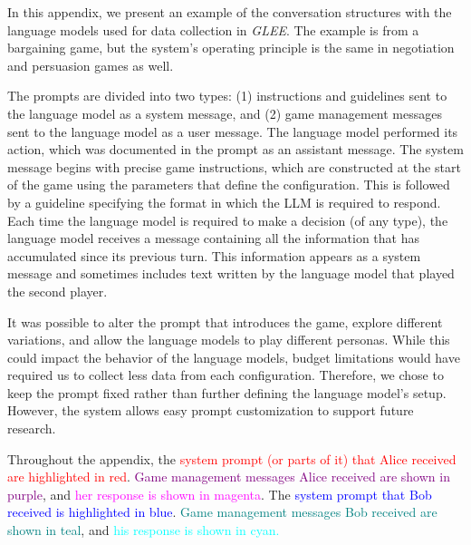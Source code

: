 \newcommand{\aliceSystem}[1]{\textcolor{red}{#1}}
\newcommand{\alicePrompt}[1]{\textcolor{purple}{#1}}
\newcommand{\aliceMessage}[1]{\textcolor{magenta}{#1}}

\newcommand{\bobSystem}[1]{\textcolor{blue}{#1}}
\newcommand{\bobPrompt}[1]{\textcolor{teal}{#1}}
\newcommand{\bobMessage}[1]{\textcolor{cyan}{#1}}

In this appendix, we present an example of the conversation structures with the language models used for data collection in \textit{GLEE}. The example is from a bargaining game, but the system's operating principle is the same in negotiation and persuasion games as well.

The prompts are divided into two types: (1) instructions and guidelines sent to the language model as a system message, and (2) game management messages sent to the language model as a user message. The language model performed its action, which was documented in the prompt as an assistant message. The system message begins with precise game instructions, which are constructed at the start of the game using the parameters that define the configuration. This is followed by a guideline specifying the format in which the LLM is required to respond. Each time the language model is required to make a decision (of any type), the language model receives a message containing all the information that has accumulated since its previous turn. This information appears as a system message and sometimes includes text written by the language model that played the second player.

It was possible to alter the prompt that introduces the game, explore different variations, and allow the language models to play different personas. While this could impact the behavior of the language models, budget limitations would have required us to collect less data from each configuration. Therefore, we chose to keep the prompt fixed rather than further defining the language model's setup. However, the system allows easy prompt customization to support future research.

Throughout the appendix, the \aliceSystem{system prompt (or parts of it) that Alice received are highlighted in red}. \alicePrompt{Game management messages Alice received are shown in purple}, and \aliceMessage{her response is shown in magenta}. The \bobSystem{system prompt that Bob received is highlighted in blue}. \bobPrompt{Game management messages Bob received are shown in teal}, and \bobMessage{his response is shown in cyan.}



